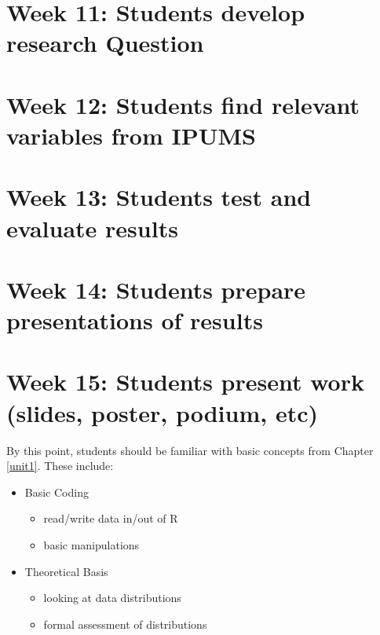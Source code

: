 \documentclass[
]{book}
\providecommand{\tightlist}{%
  \setlength{\itemsep}{0pt}\setlength{\parskip}{0pt}}
\begin{document}
\hypertarget{week-11-students-develop-research-question-1}{%
\section{Week 11: Students develop research Question}\label{week-11-students-develop-research-question-1}}

\hypertarget{week-12-students-find-relevant-variables-from-ipums-1}{%
\section{Week 12: Students find relevant variables from IPUMS}\label{week-12-students-find-relevant-variables-from-ipums-1}}

\hypertarget{week-13-students-test-and-evaluate-results-1}{%
\section{Week 13: Students test and evaluate results}\label{week-13-students-test-and-evaluate-results-1}}

\hypertarget{week-14-students-prepare-presentations-of-results-1}{%
\section{Week 14: Students prepare presentations of results}\label{week-14-students-prepare-presentations-of-results-1}}

\hypertarget{week-15-students-present-work-slides-poster-podium-etc-1}{%
\section{Week 15: Students present work (slides, poster, podium, etc)}\label{week-15-students-present-work-slides-poster-podium-etc-1}}

By this point, students should be familiar with basic concepts from Chapter \ref{unit1}. These include:

\begin{itemize}
\tightlist
\item
  Basic Coding

  \begin{itemize}
  \tightlist
  \item
    read/write data in/out of R
  \item
    basic manipulations
  \end{itemize}
\item
  Theoretical Basis

  \begin{itemize}
  \tightlist
  \item
    looking at data distributions
  \item
    formal assessment of distributions
  \end{itemize}
\end{itemize}
\end{document}
